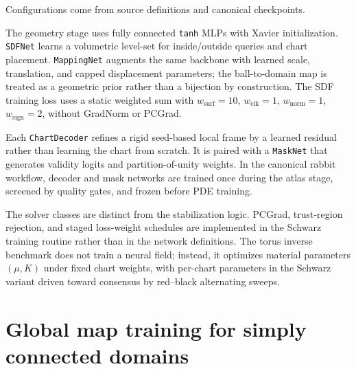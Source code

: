 \documentclass[sort&compress]{svjour3} %
\begin{document}
\begin{table}[htbp]
\begin{threeparttable}
\begin{tabular}{>{\raggedright\arraybackslash}p{1.8cm}>{\raggedright\arraybackslash}p{2.05cm}>{\raggedright\arraybackslash}p{1.55cm}>{\raggedright\arraybackslash}p{6.1cm}>{\raggedright\arraybackslash}p{1.3cm}}
\bottomrule
\end{tabular}
\begin{tablenotes}[flushleft]
\item Configurations come from source definitions and canonical checkpoints.
\end{tablenotes}
\end{threeparttable}
\end{table}

The geometry stage uses fully connected \texttt{tanh} MLPs with Xavier initialization. \texttt{SDFNet} learns a volumetric level-set for inside/outside queries and chart placement. \texttt{MappingNet} augments the same backbone with learned scale, translation, and capped displacement parameters; the ball-to-domain map is treated as a geometric prior rather than a bijection by construction. The SDF training loss uses a static weighted sum with $w_{\mathrm{surf}}=10$, $w_{\mathrm{eik}}=1$, $w_{\mathrm{norm}}=1$, $w_{\mathrm{sign}}=2$, without GradNorm or PCGrad.

Each \texttt{ChartDecoder} refines a rigid seed-based local frame by a learned residual rather than learning the chart from scratch. It is paired with a \texttt{MaskNet} that generates validity logits and partition-of-unity weights. In the canonical rabbit workflow, decoder and mask networks are trained once during the atlas stage, screened by quality gates, and frozen before PDE training.

The solver classes are distinct from the stabilization logic. PCGrad, trust-region rejection, and staged loss-weight schedules are implemented in the Schwarz training routine rather than in the network definitions. The torus inverse benchmark does not train a neural field; instead, it optimizes material parameters $(\mu,K)$ under fixed chart weights, with per-chart parameters in the Schwarz variant driven toward consensus by red--black alternating sweeps.

\section{Global map training for simply connected domains}
\label{sec:appendix_global_map}
\end{document}
